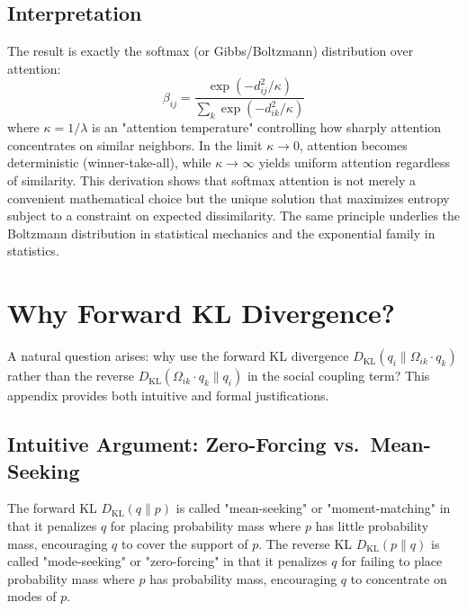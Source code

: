 \documentclass[12pt]{article}
\begin{document}
\subsection{Interpretation}

The result is exactly the softmax (or Gibbs/Boltzmann) distribution over attention:
\begin{equation}
\boxed{\beta_{ij} = \frac{\exp(-d_{ij}^2 / \kappa)}{\sum_k \exp(-d_{ik}^2 / \kappa)}}
\end{equation}
where $\kappa = 1/\lambda$ is an "attention temperature" controlling how sharply attention concentrates on similar neighbors. In the limit $\kappa \to 0$, attention becomes deterministic (winner-take-all), while $\kappa \to \infty$ yields uniform attention regardless of similarity. This derivation shows that softmax attention is not merely a convenient mathematical choice but the unique solution that maximizes entropy subject to a constraint on expected dissimilarity. The same principle underlies the Boltzmann distribution in statistical mechanics and the exponential family in statistics.


\section{Why Forward KL Divergence?}
\label{app:forward_kl}

A natural question arises: why use the forward KL divergence $D_{\mathrm{KL}}(q_i \| \Omega_{ik}\cdot q_k)$ rather than the reverse $D_{\mathrm{KL}}(\Omega_{ik}\cdot q_k \| q_i)$ in the social coupling term? This appendix provides both intuitive and formal justifications.

\subsection{Intuitive Argument: Zero-Forcing vs.\ Mean-Seeking}

The forward KL $D_{\mathrm{KL}}(q \| p)$ is called "mean-seeking" or "moment-matching" in that it penalizes $q$ for placing probability mass where $p$ has little probability mass, encouraging $q$ to cover the support of $p$. The reverse KL $D_{\mathrm{KL}}(p \| q)$ is called "mode-seeking" or "zero-forcing" in that it penalizes $q$ for failing to place probability mass where $p$ has probability mass, encouraging $q$ to concentrate on modes of $p$.
\end{document}
